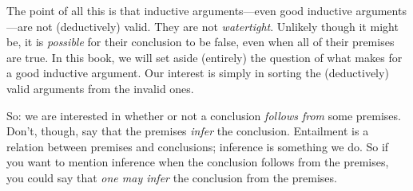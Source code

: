 The point of all this is that inductive arguments---even good inductive arguments---are not (deductively) valid. They are not \emph{watertight}. Unlikely though it might be, it is \emph{possible} for their conclusion to be false, even when all of their premises are true. In this book, we will set aside (entirely) the question of what makes for a good inductive argument. Our interest is simply in sorting the (deductively) valid arguments from the invalid ones.  

So: we are interested in whether or not a conclusion \emph{follows from} some premises. Don't, though, say that the premises \emph{infer} the conclusion. Entailment is a relation between premises and conclusions; inference is something we do. So if you want to mention inference when the conclusion follows from the premises, you could say that \emph{one may infer} the conclusion from the premises.


